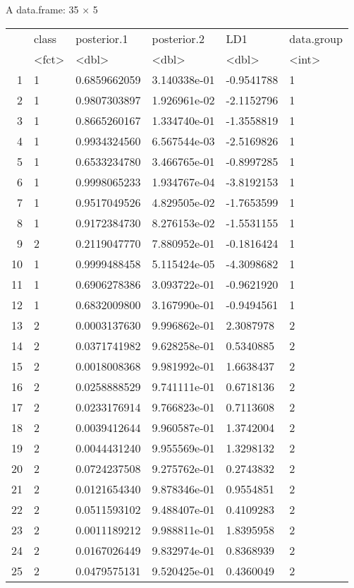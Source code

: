 \documentclass[11pt]{article}
\begin{document}
    A data.frame: 35 × 5
\begin{tabular}{r|lllll}
  & class & posterior.1 & posterior.2 & LD1 & data.group\\
  & <fct> & <dbl> & <dbl> & <dbl> & <int>\\
\hline
	1 & 1 & 0.6859662059 & 3.140338e-01 & -0.9541788 & 1\\
	2 & 1 & 0.9807303897 & 1.926961e-02 & -2.1152796 & 1\\
	3 & 1 & 0.8665260167 & 1.334740e-01 & -1.3558819 & 1\\
	4 & 1 & 0.9934324560 & 6.567544e-03 & -2.5169826 & 1\\
	5 & 1 & 0.6533234780 & 3.466765e-01 & -0.8997285 & 1\\
	6 & 1 & 0.9998065233 & 1.934767e-04 & -3.8192153 & 1\\
	7 & 1 & 0.9517049526 & 4.829505e-02 & -1.7653599 & 1\\
	8 & 1 & 0.9172384730 & 8.276153e-02 & -1.5531155 & 1\\
	9 & 2 & 0.2119047770 & 7.880952e-01 & -0.1816424 & 1\\
	10 & 1 & 0.9999488458 & 5.115424e-05 & -4.3098682 & 1\\
	11 & 1 & 0.6906278386 & 3.093722e-01 & -0.9621920 & 1\\
	12 & 1 & 0.6832009800 & 3.167990e-01 & -0.9494561 & 1\\
	13 & 2 & 0.0003137630 & 9.996862e-01 &  2.3087978 & 2\\
	14 & 2 & 0.0371741982 & 9.628258e-01 &  0.5340885 & 2\\
	15 & 2 & 0.0018008368 & 9.981992e-01 &  1.6638437 & 2\\
	16 & 2 & 0.0258888529 & 9.741111e-01 &  0.6718136 & 2\\
	17 & 2 & 0.0233176914 & 9.766823e-01 &  0.7113608 & 2\\
	18 & 2 & 0.0039412644 & 9.960587e-01 &  1.3742004 & 2\\
	19 & 2 & 0.0044431240 & 9.955569e-01 &  1.3298132 & 2\\
	20 & 2 & 0.0724237508 & 9.275762e-01 &  0.2743832 & 2\\
	21 & 2 & 0.0121654340 & 9.878346e-01 &  0.9554851 & 2\\
	22 & 2 & 0.0511593102 & 9.488407e-01 &  0.4109283 & 2\\
	23 & 2 & 0.0011189212 & 9.988811e-01 &  1.8395958 & 2\\
	24 & 2 & 0.0167026449 & 9.832974e-01 &  0.8368939 & 2\\
	25 & 2 & 0.0479575131 & 9.520425e-01 &  0.4360049 & 2\\

\end{tabular}
\end{document}
